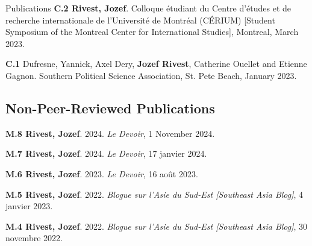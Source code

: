 \documentclass{resume} %
\begin{document}
\begin{rSection}{Publications}
	{\textbf{C.2 Rivest, Jozef}.  Colloque étudiant du Centre d’études et de recherche
	internationale de l’Université de Montréal (CÉRIUM) [Student
			Symposium of the Montreal Center for International Studies],
	Montreal, March 2023.} \par

	{\textbf{C.1} Dufresne, Yannick, Axel Dery, \textbf{Jozef Rivest},
		Catherine Ouellet and Etienne Gagnon.  Southern Political Science Association,
		St. Pete Beach, January 2023.}



	\subsection*{Non-Peer-Reviewed Publications}

	{\textbf{M.8 Rivest, Jozef}. 2024. 
		\textit{Le Devoir}, 1 November 2024.}

	{\textbf{M.7 Rivest, Jozef}. 2024.  \textit{Le Devoir}, 17 janvier 2024.} \par

	{\textbf{M.6 Rivest, Jozef}. 2023.  \textit{Le Devoir}, 16 août 2023.} \par

	{\textbf{M.5 Rivest, Jozef}. 2022.  \textit{Blogue sur
	l’Asie du Sud-Est [Southeast Asia Blog]}, 4 janvier 2023.} \par

	{\textbf{M.4 Rivest, Jozef}. 2022.  \textit{Blogue sur l’Asie
	du Sud-Est [Southeast Asia Blog]}, 30 novembre 2022.} \par


\end{rSection}
\end{document}
